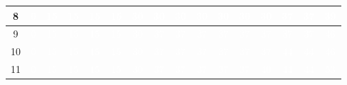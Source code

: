 \documentclass{article}
\begin{document}
\begin{center}
\begin{tabular}{|c|c|c|c|c|c|c|c|c|c|c|c|c|c|c|c|}
8 & \cellcolor{rojo}\textcolor{white}{0} & \cellcolor{verde}\textcolor{white}{15} & \cellcolor{rojo}\textcolor{white}{15} & \cellcolor{rojo}\textcolor{white}{15} & \cellcolor{rojo}\textcolor{white}{15} & \cellcolor{verde}\textcolor{white}{30} & \cellcolor{rojo}\textcolor{white}{30} & \cellcolor{rojo}\textcolor{white}{30} & \cellcolor{rojo}\textcolor{white}{30} & \cellcolor{rojo}\textcolor{white}{30} & \cellcolor{rojo}\textcolor{white}{30} & \cellcolor{rojo}\textcolor{white}{30} & \cellcolor{verde}\textcolor{white}{37} & \cellcolor{rojo}\textcolor{white}{37} & \cellcolor{verde}\textcolor{white}{39} \\ \hline
9 & \cellcolor{rojo}\textcolor{white}{0} & \cellcolor{verde}\textcolor{white}{15} & \cellcolor{rojo}\textcolor{white}{15} & \cellcolor{rojo}\textcolor{white}{15} & \cellcolor{rojo}\textcolor{white}{15} & \cellcolor{verde}\textcolor{white}{30} & \cellcolor{verde}\textcolor{white}{37} & \cellcolor{rojo}\textcolor{white}{37} & \cellcolor{rojo}\textcolor{white}{37} & \cellcolor{rojo}\textcolor{white}{37} & \cellcolor{rojo}\textcolor{white}{37} & \cellcolor{rojo}\textcolor{white}{37} & \cellcolor{rojo}\textcolor{white}{37} & \cellcolor{rojo}\textcolor{white}{37} & \cellcolor{verde}\textcolor{white}{46} \\ \hline
10 & \cellcolor{rojo}\textcolor{white}{0} & \cellcolor{verde}\textcolor{white}{15} & \cellcolor{rojo}\textcolor{white}{15} & \cellcolor{rojo}\textcolor{white}{15} & \cellcolor{rojo}\textcolor{white}{15} & \cellcolor{verde}\textcolor{white}{30} & \cellcolor{verde}\textcolor{white}{37} & \cellcolor{rojo}\textcolor{white}{37} & \cellcolor{rojo}\textcolor{white}{37} & \cellcolor{rojo}\textcolor{white}{37} & \cellcolor{rojo}\textcolor{white}{37} & \cellcolor{rojo}\textcolor{white}{37} & \cellcolor{verde}\textcolor{white}{44} & \cellcolor{rojo}\textcolor{white}{44} & \cellcolor{verde}\textcolor{white}{46} \\ \hline
11 & \cellcolor{rojo}\textcolor{white}{0} & \cellcolor{verde}\textcolor{white}{15} & \cellcolor{rojo}\textcolor{white}{15} & \cellcolor{rojo}\textcolor{white}{15} & \cellcolor{rojo}\textcolor{white}{15} & \cellcolor{verde}\textcolor{white}{30} & \cellcolor{verde}\textcolor{white}{37} & \cellcolor{rojo}\textcolor{white}{37} & \cellcolor{rojo}\textcolor{white}{37} & \cellcolor{rojo}\textcolor{white}{37} & \cellcolor{rojo}\textcolor{white}{37} & \cellcolor{verde}\textcolor{white}{40} & \cellcolor{verde}\textcolor{white}{44} & \cellcolor{rojo}\textcolor{white}{44} & \cellcolor{verde}\textcolor{white}{53} \\ \hline

\end{tabular}
\end{center}
\end{document}
